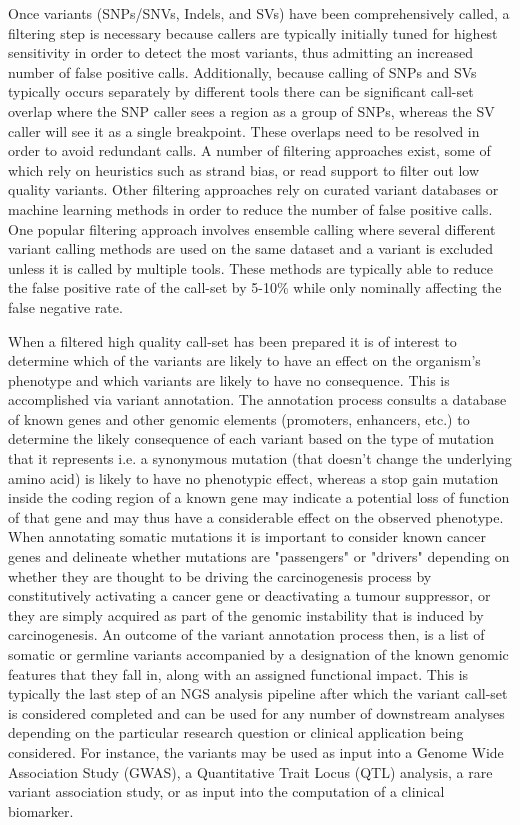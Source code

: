 Once variants (SNPs/SNVs, Indels, and SVs) have been comprehensively called, a filtering step is necessary because callers are typically initially tuned for highest sensitivity in order to detect the most variants, thus admitting an increased number of false positive calls. Additionally, because calling of SNPs and SVs typically occurs separately by different tools there can be significant call-set overlap where the SNP caller sees a region as a group of SNPs, whereas the SV caller will see it as a single breakpoint. These overlaps need to be resolved in order to avoid redundant calls. A number of filtering approaches exist, some of which rely on heuristics such as strand bias, or read support to filter out low quality variants. Other filtering approaches rely on curated variant databases or machine learning methods in order to reduce the number of false positive calls. One popular filtering approach involves ensemble calling where several different variant calling methods are used on the same dataset and a variant is excluded unless it is called by multiple tools. These methods are typically able to reduce the false positive rate of the call-set by 5-10\% while only nominally affecting the false negative rate.

When a filtered high quality call-set has been prepared it is of interest to determine which of the variants are likely to have an effect on the organism's phenotype and which variants are likely to have no consequence. This is accomplished via variant annotation. The annotation process consults a database of known genes and other genomic elements (promoters, enhancers, etc.) to determine the likely consequence of each variant based on the type of mutation that it represents i.e. a synonymous mutation (that doesn't change the underlying amino acid) is likely to have no phenotypic effect, whereas a stop gain mutation inside the coding region of a known gene may indicate a potential loss of function of that gene and may thus have a considerable effect on the observed phenotype. When annotating somatic mutations it is important to consider known cancer genes and delineate whether mutations are "passengers" or "drivers" depending on whether they are thought to be driving the carcinogenesis process by constitutively activating a cancer gene or deactivating a tumour suppressor, or they are simply acquired as part of the genomic instability that is induced by carcinogenesis. An outcome of the variant annotation process then, is a list of somatic or germline variants accompanied by a designation of the known genomic features that they fall in, along with an assigned functional impact. This is typically the last step of an NGS analysis pipeline after which the variant call-set is considered completed and can be used for any number of downstream analyses depending on the particular research question or clinical application being considered. For instance, the variants may be used as input into a Genome Wide Association Study (GWAS), a Quantitative Trait Locus (QTL) analysis, a rare variant association study, or as input into the computation of a clinical biomarker. 

